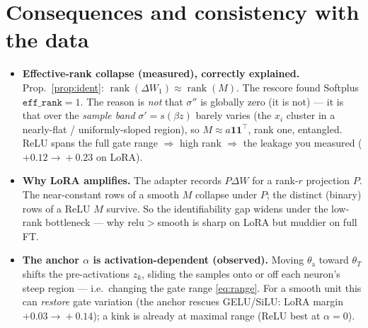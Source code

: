 \documentclass[11pt]{article}
\newcommand{\dW}{\Delta W}
\newcommand{\rank}{\operatorname{rank}}
\begin{document}
\section{Consequences and consistency with the data}
\begin{itemize}
  \item \textbf{Effective-rank collapse (measured), correctly explained.} Prop.~\ref{prop:ident}:
  $\rank(\dW_1)\approx\rank(M)$. The rescore found Softplus $\texttt{eff\_rank}=1$. The reason is
  \emph{not} that $\sigma''$ is globally zero (it is not) --- it is that over the \emph{sample band}
  $\sigma'=s(\beta z)$ barely varies (the $x_i$ cluster in a nearly-flat / uniformly-sloped region), so
  $M\approx a\bm1\bm1^\top$, rank one, entangled. ReLU spans the full gate range $\Rightarrow$ high rank
  $\Rightarrow$ the leakage you measured ($+0.12\!\to\!+0.23$ on LoRA).
  \item \textbf{Why LoRA amplifies.} The adapter records $P\dW$ for a rank-$r$ projection $P$. The
  near-constant rows of a smooth $M$ collapse under $P$; the distinct (binary) rows of a ReLU $M$
  survive. So the identifiability gap widens under the low-rank bottleneck --- why relu$>$smooth is
  sharp on LoRA but muddier on full FT.
  \item \textbf{The anchor $\alpha$ is activation-dependent (observed).} Moving $\theta_{\mathrm a}$
  toward $\theta_T$ shifts the pre-activations $z_k$, sliding the samples onto or off each neuron's
  steep region --- i.e.\ changing the gate range \eqref{eq:range}. For a smooth unit this can
  \emph{restore} gate variation (the anchor rescues GELU/SiLU: LoRA margin $+0.03\!\to\!+0.14$); a kink
  is already at maximal range (ReLU best at $\alpha{=}0$).
\end{itemize}
\end{document}
